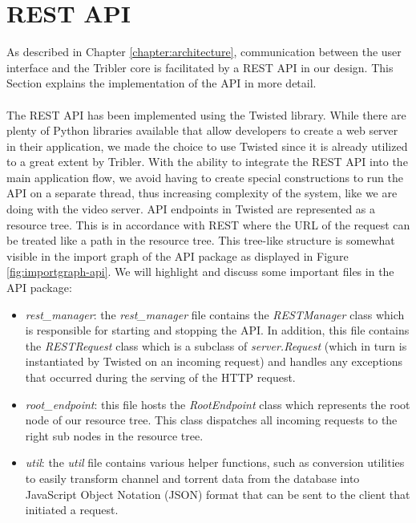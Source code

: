 \section{REST API}
As described in Chapter \ref{chapter:architecture}, communication between the user interface and the Tribler core is facilitated by a REST API in our design. This Section explains the implementation of the API in more detail.\\\\
The REST API has been implemented using the Twisted library. While there are plenty of Python libraries available that allow developers to create a web server in their application, we made the choice to use Twisted since it is already utilized to a great extent by Tribler. With the ability to integrate the REST API into the main application flow, we avoid having to create special constructions to run the API on a separate thread, thus increasing complexity of the system, like we are doing with the video server. API endpoints in Twisted are represented as a resource tree. This is in accordance with REST where the URL of the request can be treated like a path in the resource tree. This tree-like structure is somewhat visible in the import graph of the API package as displayed in Figure \ref{fig:importgraph-api}. We will highlight and discuss some important files in the API package:
\begin{itemize}
	\item \emph{rest\_manager}: the \emph{rest\_manager} file contains the \emph{RESTManager} class which is responsible for starting and stopping the API. In addition, this file contains the \emph{RESTRequest} class which is a subclass of \emph{server.Request} (which in turn is instantiated by Twisted on an incoming request) and handles any exceptions that occurred during the serving of the HTTP request.
	\item \emph{root\_endpoint}: this file hosts the \emph{RootEndpoint} class which represents the root node of our resource tree. This class dispatches all incoming requests to the right sub nodes in the resource tree.
	\item \emph{util}: the \emph{util} file contains various helper functions, such as conversion utilities to easily transform channel and torrent data from the database into JavaScript Object Notation (JSON) format that can be sent to the client that initiated a request.
\end{itemize}

